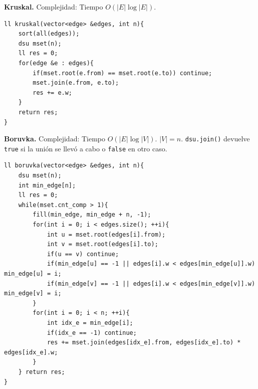 \documentclass[12 pts,spanish,mexico]{article}
\numberwithin{equation}{section}
\newcommand{\pa}[1]{\left( #1 \right)}
\begin{document}
\begin{multicols}{2}
\textbf{Kruskal.} Complejidad: Tiempo $O\pa{|E|\log |E|}$.
\begin{verbatim}
ll kruskal(vector<edge> &edges, int n){
    sort(all(edges));
    dsu mset(n);
    ll res = 0;
    for(edge &e : edges){
        if(mset.root(e.from) == mset.root(e.to)) continue;
        mset.join(e.from, e.to);
        res += e.w;
    }
    return res;
}
\end{verbatim}

\textbf{Boruvka.} Complejidad: Tiempo $O\pa{|E|\log |V|}$. $|V| = n$. \texttt{dsu.join()} devuelve \texttt{true} si la unión se llevó a cabo o \texttt{false} en otro caso.
\begin{verbatim}
ll boruvka(vector<edge> &edges, int n){
    dsu mset(n);
    int min_edge[n];
    ll res = 0;
    while(mset.cnt_comp > 1){
        fill(min_edge, min_edge + n, -1);
        for(int i = 0; i < edges.size(); ++i){
            int u = mset.root(edges[i].from);
            int v = mset.root(edges[i].to);
            if(u == v) continue;
            if(min_edge[u] == -1 || edges[i].w < edges[min_edge[u]].w) min_edge[u] = i;
            if(min_edge[v] == -1 || edges[i].w < edges[min_edge[v]].w) min_edge[v] = i;
        }
        for(int i = 0; i < n; ++i){
            int idx_e = min_edge[i];
            if(idx_e == -1) continue;
            res += mset.join(edges[idx_e].from, edges[idx_e].to) * edges[idx_e].w;
        }
    } return res;
}
\end{verbatim}


\end{multicols}
\end{document}
